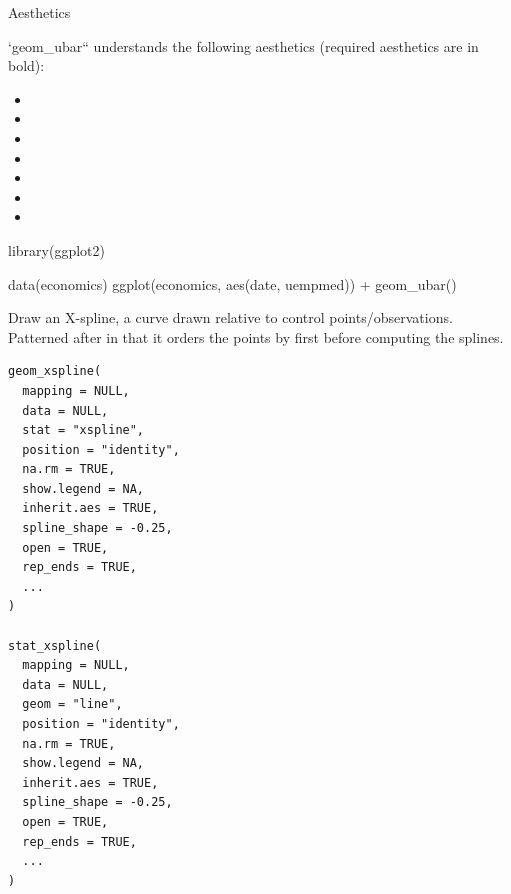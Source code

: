\documentclass[a4paper]{book}
\begin{document}
%
\begin{Section}{Aesthetics}

`geom\_ubar`` understands the following aesthetics (required aesthetics are in bold):
\begin{itemize}

\item{} 
\item{} 
\item{} 
\item{} 
\item{} 
\item{} 
\item{} 

\end{itemize}

\end{Section}
%
\begin{Examples}
\begin{ExampleCode}
library(ggplot2)

data(economics)
ggplot(economics, aes(date, uempmed)) +
  geom_ubar()
\end{ExampleCode}
\end{Examples}
%
\begin{Description}
Draw an X-spline, a curve drawn relative to control points/observations.
Patterned after  in that it orders the points by 
first before computing the splines.
\end{Description}
%
\begin{Usage}
\begin{verbatim}
geom_xspline(
  mapping = NULL,
  data = NULL,
  stat = "xspline",
  position = "identity",
  na.rm = TRUE,
  show.legend = NA,
  inherit.aes = TRUE,
  spline_shape = -0.25,
  open = TRUE,
  rep_ends = TRUE,
  ...
)

stat_xspline(
  mapping = NULL,
  data = NULL,
  geom = "line",
  position = "identity",
  na.rm = TRUE,
  show.legend = NA,
  inherit.aes = TRUE,
  spline_shape = -0.25,
  open = TRUE,
  rep_ends = TRUE,
  ...
)
\end{verbatim}
\end{Usage}
%
\end{document}
